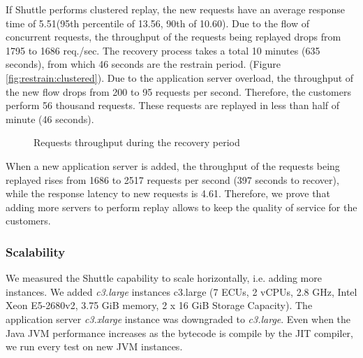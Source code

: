 

If Shuttle performs clustered replay, the new requests have an average response time of 5.51\ms (95th percentile of 13.56\ms, 90th of 10.60\ms). Due to the flow of concurrent requests, the throughput of the requests being replayed drops from 1795 to 1686 req./sec. The recovery process takes a total 10 minutes (635 seconds), from which 46 seconds are the restrain period. (Figure \ref{fig:restrain:clustered}). Due to the application server overload, the throughput of the new flow drops from 200 to 95 requests per second. Therefore, the customers perform 56 thousand requests. These requests are replayed in less than half of minute (46 seconds).

\begin{figure}[!htb]
  \centering
  \caption{Requests throughput during the recovery period}
  \label{fig:restrain}
\end{figure}

When a new application server is added, the throughput of the requests being replayed rises from 1686 to 2517 requests per second (397 seconds to recover), while the response latency to new requests is 4.61\ms. Therefore, we prove that adding more servers to perform replay allows to keep the quality of service for the customers.









\subsubsection{Scalability}\label{sec:eval:recovery:scalability}
We measured the Shuttle capability to scale horizontally, i.e. adding more instances. We added \emph{c3.large} instances c3.large (7 \ac{ECU}s, 2 vCPUs, 2.8 GHz, Intel Xeon E5-2680v2, 3.75 GiB memory, 2 x 16 GiB Storage Capacity). The application server \emph{c3.xlarge} instance was downgraded to \emph{c3.large}. Even when the Java \ac{JVM} performance increases as the bytecode is compile by the \ac{JIT} compiler, we run every test on new \ac{JVM} instances.

